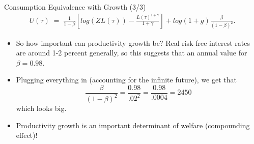 \documentclass[10pt,c,aspectratio=1610,handout]{beamer}
\begin{document}
\begin{frame}{Consumption Equivalence with Growth (3/3)}%
  \begin{align*}%
    U(\tau ) \; = \; \frac{1}{1-\beta }\left[ log(ZL(\tau )) -\frac{L(\tau )^{1+\gamma }}{1+\gamma }\right]  + log(1+g) \frac{\beta}{(1-\beta)^2}.%
  \end{align*}%
  \pause%
  \begin{itemize}%
    \item[$\blacktriangleright$] So how important can productivity growth be? Real risk-free interest rates are around 1-2 percent generally, so this suggests that an annual value for $\beta = 0.98$.%
    \item[$\blacktriangleright$] Plugging everything in (accounting for the infinite future), we get that \[ \frac{\beta}{(1-\beta)^2} = \frac{0.98}{.02^2} = \frac{0.98}{.0004} = 2450\] which looks big.%
    \item[$\blacktriangleright$] Productivity growth is an important determinant of welfare (compounding effect)!%
  \end{itemize}%
\end{frame}%
\end{document}
